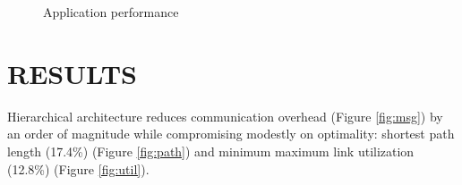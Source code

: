 \documentclass[portrait,a1]{a0poster}
\begin{document}
\begin{multicols}{2}
\begin{figure}[H]
  \begin{center}  
  \end{center}
\caption{Application performance}
\end{figure}

\color{SaddleBrown}
\section*{RESULTS}
\color{DarkSlateGray}
Hierarchical architecture reduces communication overhead (Figure \ref{fig:msg}) by an order of magnitude while compromising modestly on optimality: shortest path length (17.4\%) (Figure \ref{fig:path}) and minimum maximum link utilization (12.8\%) (Figure \ref{fig:util}).


\end{multicols}
\end{document}
